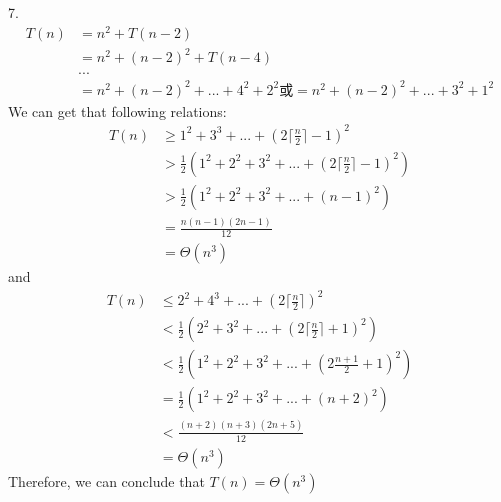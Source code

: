 7.
\begin{align*}
 T(n) &= n^2 + T(n-2) \\
      &= n^2 + (n-2)^2 + T(n-4)\\
      &...\\
      &= n^2 + (n-2)^2 + ... + 4^2 + 2^2 \textrm{或} = n^2 + (n-2)^2 + ... + 3^2 + 1^2
\end{align*}
We can get that following relations:
\begin{align*}
 T(n) &\geq 1^2+3^3+...+(2\lceil\frac{n}{2}\rceil-1)^2 \\
      &> \frac{1}{2}(1^2+2^2+3^2+...+(2\lceil\frac{n}{2}\rceil-1)^2) \\
      &> \frac{1}{2}(1^2+2^2+3^2+...+(n-1)^2) \\
      &=\frac{n(n-1)(2n-1)}{12} \\
      &=\Theta(n^3)
\end{align*}
and
\begin{align*}
 T(n) &\leq 2^2+4^3+...+(2\lceil\frac{n}{2}\rceil)^2 \\
      &< \frac{1}{2}(2^2+3^2+...+(2\lceil\frac{n}{2}\rceil+1)^2) \\
      &< \frac{1}{2}(1^2+2^2+3^2+...+(2\frac{n+1}{2}+1)^2) \\
      &= \frac{1}{2}(1^2+2^2+3^2+...+(n+2)^2) \\
      &< \frac{(n+2)(n+3)(2n+5)}{12} \\
      &=\Theta(n^3)
\end{align*}
Therefore, we can conclude that $T(n)=\Theta(n^3)$
